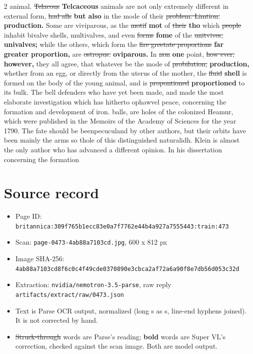 \documentclass[10pt]{article}
\begin{document}
\begin{multicols}{2}
animal. \sout{Telacous} \textbf{Telcaceous} animals are not only extremely different in external form, \sout{had alls} \textbf{but also} in the mode of their \sout{problem. Limtion.} \textbf{production.} Some are viviparous, as the \sout{motif} \textbf{mot} of \sout{their} \textbf{tho} which \sout{people} inhabit bivalve shells, multivalves, and even \sout{forms} \textbf{fome} of the \sout{unitvives,} \textbf{univalves;} while the others, which form the \sout{fire greetate proportions} \textbf{far greater proportion,} are \sout{ostropus.} \textbf{oviparous.} In \sout{non} \textbf{one} point, \sout{how ever,} \textbf{however,} they all agree, that whatever be the mode of \sout{probilution,} \textbf{production,} whether from an egg, or directly from the uterus of the mother, the \sout{fluid} \textbf{shell} is formed on the body of the young animal, and is \sout{propontioned} \textbf{proportioned} to its bulk. The bell defenders who have yet been made, and made the most elaborate investigation which has hitherto ophawvel peace, concerning the formation and development of iron. balls, are holes of the colonized Heamur, which were published in the Memoirs of the Academy of Sciences for the year 1790. The fate should be beenpecuculand by other authors, but their orbits have been mainly the arms so thole of this distinguished naturalidh. Klein is almost the only author who has advanced a different opinion. In his dissertation concerning the formation
\end{multicols}
\section*{Source record}
\begin{itemize}
\item Page ID: \texttt{britannica:309f765b1ecc83e0a7f7762e44b4a927a7555443:train:473}
\item Scan: \texttt{page-0473-4ab88a7103cd.jpg}, 600 x 812 px
\item Image SHA-256: \texttt{\small 4ab88a7103cd8f6c0c4f49cde0370890e3cbca2af72a6a90f8e7db56d053c32d}
\item Extraction: \texttt{nvidia/nemotron-3.5-parse}, raw reply \texttt{artifacts/extract/raw/0473.json}
\item Text is Parse OCR output, normalized (long s as s, line-end hyphens joined). It is not corrected by hand.
\item \sout{Struck-through} words are Parse's reading; \textbf{bold} words are Super VL's correction, checked against the scan image. Both are model output.
\end{itemize}
\end{document}
